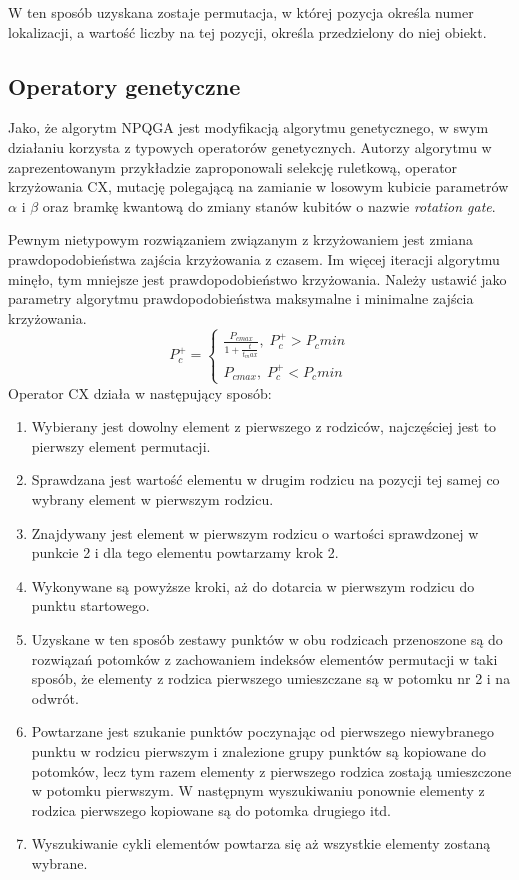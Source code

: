 W ten sposób uzyskana zostaje permutacja, w której pozycja określa numer lokalizacji, a wartość liczby na tej pozycji, określa przedzielony do niej obiekt.

\subsection{Operatory genetyczne}
Jako, że algorytm NPQGA jest modyfikacją algorytmu genetycznego, w swym działaniu korzysta z typowych operatorów genetycznych. Autorzy algorytmu w  zaprezentowanym przykładzie zaproponowali selekcję ruletkową, operator krzyżowania CX, mutację polegającą na zamianie w losowym kubicie parametrów $\alpha$ i $\beta$ oraz bramkę kwantową do zmiany stanów kubitów o nazwie \textit{rotation gate}.

Pewnym nietypowym rozwiązaniem związanym z krzyżowaniem jest zmiana prawdopodobieństwa zajścia krzyżowania z czasem. Im więcej iteracji algorytmu minęło, tym mniejsze jest prawdopodobieństwo krzyżowania. Należy ustawić jako parametry algorytmu prawdopodobieństwa maksymalne i minimalne zajścia krzyżowania.
\newline
\begin{equation}
P_c^+= \left\{ \begin{array}{ccc} \frac{P_{c max}}{1+\frac{t}{t_max}}, \; P_c^+ > P_c min \\ P_{c max}, \; P_c^+ < P_c min \end{array} \right.
\end{equation}
\newline
Operator CX działa w następujący sposób:
\begin{enumerate}
\item Wybierany jest dowolny element z pierwszego z rodziców, najczęściej jest to pierwszy element permutacji.
\item Sprawdzana jest wartość elementu w drugim rodzicu na pozycji tej samej co wybrany element w pierwszym rodzicu.
\item Znajdywany jest element w pierwszym rodzicu o wartości sprawdzonej w punkcie 2 i dla tego elementu powtarzamy krok 2.
\item Wykonywane są powyższe kroki, aż do dotarcia w pierwszym rodzicu do punktu startowego.
\item Uzyskane w ten sposób zestawy punktów w obu rodzicach przenoszone są do rozwiązań potomków z zachowaniem indeksów elementów permutacji w taki sposób, że elementy z rodzica pierwszego umieszczane są w potomku nr 2 i na odwrót.
\item Powtarzane jest szukanie punktów poczynając od pierwszego niewybranego punktu w rodzicu pierwszym i znalezione grupy punktów są kopiowane do potomków, lecz tym razem elementy z pierwszego rodzica zostają umieszczone w potomku pierwszym. W następnym wyszukiwaniu ponownie elementy z rodzica pierwszego kopiowane są do potomka drugiego itd.
\item Wyszukiwanie cykli elementów powtarza się aż wszystkie elementy zostaną wybrane.
\end{enumerate}

